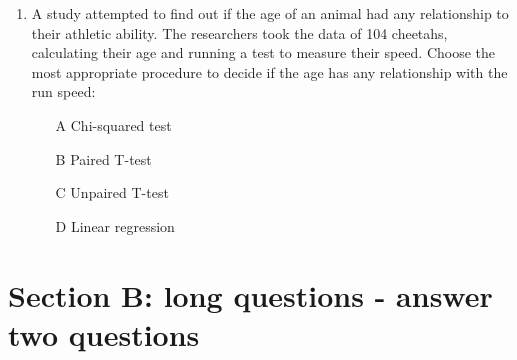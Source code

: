 \documentclass{article}
\newif\ifanswer
\begin{document}
\begin{enumerate}
\ifanswer
(Answer: C)
\fi

\item A study attempted to find out if the age of an animal had any
  relationship to their athletic ability. The researchers took the
  data of 104 cheetahs, calculating their age and running a test to
  measure their speed. Choose the most appropriate procedure to decide
  if the age has any relationship with the run speed:
\begin{itemize}
\item[A] Chi-squared test
\item[B] Paired T-test
\item[C] Unpaired T-test
\item[D] Linear regression
\end{itemize}

\ifanswer
(Answer: D)
\fi

\end{enumerate}
  
\section*{Section B: long questions - answer two questions}
\end{document}
